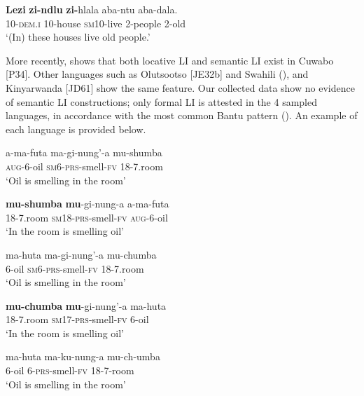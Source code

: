 \documentclass[output=paper ]{langscibook}
\begin{document}
    \ex\label{ex:mapunda:17b} \gll \textbf{Lezi}    \textbf{zi-ndlu}  \textbf{zi-}hlala  aba-ntu  aba-dala.\\
                             10-\textsc{dem.i}  10-house   \textsc{sm10}{}-live  2-people  2-old\\
                         \glt ‘(In) these houses live old people.’ \hfill\citep[107--108]{Buell2007}
    \z
\z

More recently, \citet{Guérois2014} shows that both locative LI and semantic LI exist in Cuwabo [P34]. Other languages such as Olutsootso [JE32b] and Swahili (\citealt{MartenvanderWal2014}), and Kinyarwanda [JD61] \citep{Ngoboka2016} show the same feature. Our collected data show no evidence of semantic LI constructions; only formal LI is attested in the 4 sampled languages, in accordance with the most common Bantu pattern (\citealt{MartenvanderWal2014}). An example of each language is provided below. 


\ea 
\label{ex:mapunda:18}
    \ea\label{ex:mapunda:18a} \gll  a-ma-futa    ma-gi-nung’{}-a    mu{}-shumba \\    
                                \textsc{aug}{}-6-oil    \textsc{sm6-prs}{}-smell-\textsc{fv}  18{}-7.room\\ \jambox*{[Bena]}
                            \glt  ‘Oil is smelling in the room’

    \ex\label{ex:mapunda:18b} \gll  \textbf{mu-shumba}    \textbf{mu}{}-gi-nung-a    a-ma-futa \\
                 18-7.room    \textsc{sm18}{}-\textsc{prs}{}-smell-\textsc{fv}  \textsc{aug}{}-6-oil\\
                \glt  ‘In the room is smelling oil’
    \z

\ex \label{ex:mapunda:19}
    \ea\label{ex:mapunda:19a} \gll  ma-huta  ma-gi-nung’-a    mu-chumba \\       
                                  6-oil    \textsc{sm6}{}-\textsc{prs}{}-smell-\textsc{fv}  18-7.room\\ \jambox*{[Ngoni]}
                            \glt  ‘Oil is smelling in the room’

    \ex\label{ex:mapunda:19b} \gll  \textbf{mu-chumba}    \textbf{mu}{}-gi-nung’-a  ma-huta \\
                          18-7.room    \textsc{sm17}{}-\textsc{prs}{}-smell-\textsc{fv}  6-oil\\
                        \glt  ‘In the room is smelling oil’
    \z

\ex\label{ex:mapunda:20} 
    \ea\label{ex:mapunda:20a} \gll ma-huta  ma-ku-nung-a    mu-ch-umba \\ 
                          6-oil    6-\textsc{prs}{}-smell-\textsc{fv}  18-7-room\\ \jambox*{[Yao]}
                        \glt  ‘Oil is smelling in the room’
\end{document}
